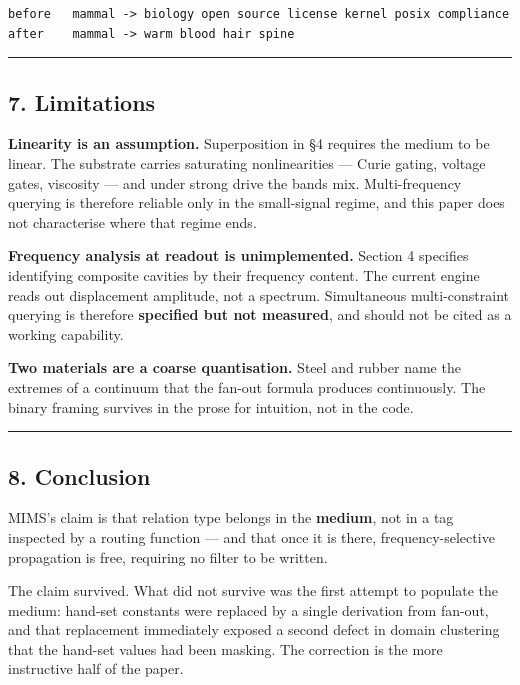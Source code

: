 \documentclass[
  11pt,
  a4paper,
]{article}
\begin{document}
\begin{verbatim}
before   mammal -> biology open source license kernel posix compliance
after    mammal -> warm blood hair spine
\end{verbatim}

\begin{center}\rule{0.5\linewidth}{0.5pt}\end{center}

\subsection{7. Limitations}\label{limitations}

\textbf{Linearity is an assumption.} Superposition in §4 requires the
medium to be linear. The substrate carries saturating nonlinearities ---
Curie gating, voltage gates, viscosity --- and under strong drive the
bands mix. Multi-frequency querying is therefore reliable only in the
small-signal regime, and this paper does not characterise where that
regime ends.

\textbf{Frequency analysis at readout is unimplemented.} Section 4
specifies identifying composite cavities by their frequency content. The
current engine reads out displacement amplitude, not a spectrum.
Simultaneous multi-constraint querying is therefore \textbf{specified
but not measured}, and should not be cited as a working capability.

\textbf{Two materials are a coarse quantisation.} Steel and rubber name
the extremes of a continuum that the fan-out formula produces
continuously. The binary framing survives in the prose for intuition,
not in the code.

\begin{center}\rule{0.5\linewidth}{0.5pt}\end{center}

\subsection{8. Conclusion}\label{conclusion}

MIMS's claim is that relation type belongs in the \textbf{medium}, not
in a tag inspected by a routing function --- and that once it is there,
frequency-selective propagation is free, requiring no filter to be
written.

The claim survived. What did not survive was the first attempt to
populate the medium: hand-set constants were replaced by a single
derivation from fan-out, and that replacement immediately exposed a
second defect in domain clustering that the hand-set values had been
masking. The correction is the more instructive half of the paper.
\end{document}
